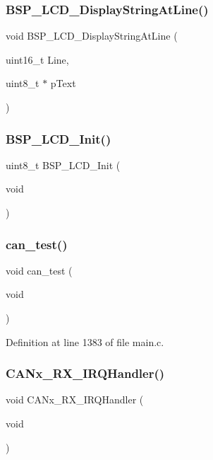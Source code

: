 \subsubsection{B\+S\+P\+\_\+\+L\+C\+D\+\_\+\+Display\+String\+At\+Line()}
{\footnotesize\ttfamily void B\+S\+P\+\_\+\+L\+C\+D\+\_\+\+Display\+String\+At\+Line (\begin{DoxyParamCaption}\item[{uint16\+\_\+t}]{Line,  }\item[{uint8\+\_\+t $\ast$}]{p\+Text }\end{DoxyParamCaption})}

\mbox{\label{main_8c_a5955111784d5c5a7b9a7492b30afd7cf}} 
\subsubsection{B\+S\+P\+\_\+\+L\+C\+D\+\_\+\+Init()}
{\footnotesize\ttfamily uint8\+\_\+t B\+S\+P\+\_\+\+L\+C\+D\+\_\+\+Init (\begin{DoxyParamCaption}\item[{void}]{ }\end{DoxyParamCaption})}

\mbox{\label{main_8c_a34823d3e597ae62cb6a000b402cd787f}} 
\subsubsection{can\+\_\+test()}
{\footnotesize\ttfamily void can\+\_\+test (\begin{DoxyParamCaption}\item[{void}]{ }\end{DoxyParamCaption})}



Definition at line 1383 of file main.\+c.

\mbox{\label{main_8c_a4372ecff238934476bb477119103ec52}} 
\subsubsection{C\+A\+Nx\+\_\+\+R\+X\+\_\+\+I\+R\+Q\+Handler()}
{\footnotesize\ttfamily void C\+A\+Nx\+\_\+\+R\+X\+\_\+\+I\+R\+Q\+Handler (\begin{DoxyParamCaption}\item[{void}]{ }\end{DoxyParamCaption})}

